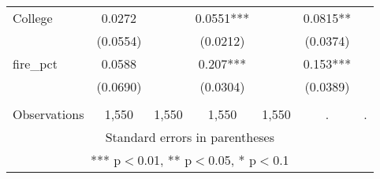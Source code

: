 \begin{tabular}{lcccccc}
College & 0.0272 &  & 0.0551*** &  & 0.0815** &  \\
 & (0.0554) &  & (0.0212) &  & (0.0374) &  \\
fire\_pct & 0.0588 &  & 0.207*** &  & 0.153*** &  \\
 & (0.0690) &  & (0.0304) &  & (0.0389) &  \\
 &  &  &  &  &  &  \\
 Observations & 1,550 & 1,550 & 1,550 & 1,550 & . & . \\ \hline
\multicolumn{7}{c}{ Standard errors in parentheses} \\
\multicolumn{7}{c}{ *** p$<$0.01, ** p$<$0.05, * p$<$0.1} \\
\end{tabular}
